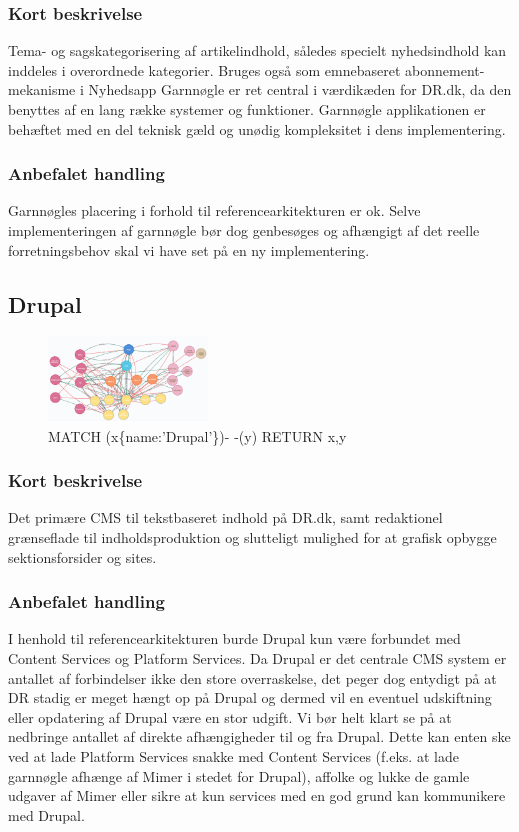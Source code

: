 \documentclass{article}
\begin{document}
\subsubsection{Kort beskrivelse}
Tema- og sagskategorisering af artikelindhold, således specielt nyhedsindhold kan inddeles i overordnede kategorier. Bruges også som emnebaseret abonnement-mekanisme i Nyhedsapp
Garnnøgle er ret central i værdikæden for DR.dk, da den benyttes af en lang række systemer og funktioner. Garnnøgle applikationen er behæftet med en del teknisk gæld og unødig kompleksitet i dens implementering.
\subsubsection{Anbefalet handling}
Garnnøgles placering i forhold til referencearkitekturen er ok. Selve implementeringen af garnnøgle bør dog genbesøges og afhængigt af det reelle forretningsbehov skal vi have set på en ny implementering.


\subsection{Drupal}
\begin{figure}[h]
\includegraphics[width=120pt]{Drupal.PNG}
\caption{MATCH (x\{name:'Drupal'\})- -(y) RETURN x,y}
\end{figure}
\subsubsection{Kort beskrivelse}
Det primære CMS til tekstbaseret indhold på DR.dk, samt redaktionel grænseflade til indholdsproduktion og slutteligt mulighed for at grafisk opbygge sektionsforsider og sites.
\subsubsection{Anbefalet handling}
I henhold til referencearkitekturen burde Drupal kun være forbundet med Content Services og Platform Services. Da Drupal er det centrale CMS system er antallet af forbindelser ikke den store overraskelse, det peger dog entydigt på at DR stadig er meget hængt op på Drupal og dermed vil en eventuel udskiftning eller opdatering af Drupal være en stor udgift.
Vi bør helt klart se på at nedbringe antallet af direkte afhængigheder til og fra Drupal. 
Dette kan enten ske ved at lade Platform Services snakke med Content Services (f.eks. at lade garnnøgle afhænge af Mimer i stedet for Drupal), affolke og lukke de gamle udgaver af Mimer eller sikre at kun services med en god grund kan kommunikere med Drupal.
\end{document}
